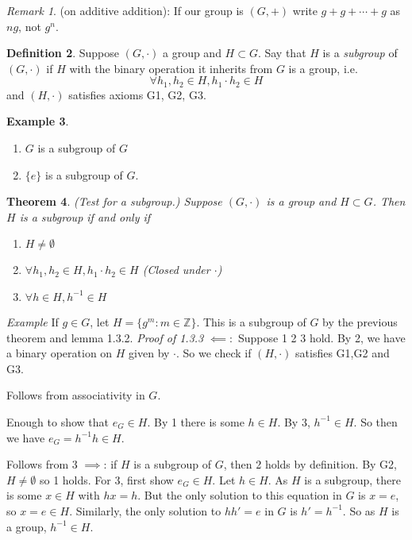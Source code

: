 \documentclass{report}
\makeatletter
\newtheorem{theorem}{Theorem}[subsection]
\theoremstyle{remark}
\newtheorem{remark}[theorem]{Remark}
\theoremstyle{definition}
\newtheorem{definition}[theorem]{Definition}
\theoremstyle{definition}
\newtheorem{example}[theorem]{Example}
\theoremstyle{theorem}
\providecommand{\varitem}{} %
\newenvironment{axioms}[1]
 {\renewcommand\varitem[1]{\item[\textbf{#1\arabic{enumi}\rlap{$##1$}.}]%
    \edef\@currentlabel{#1\arabic{enumi}{$##1$}}}%
  \enumerate[label=\textbf{#1\arabic*.}, ref=#1\arabic*]}
 {\endenumerate}
\makeatother
\begin{document}
\begin{remark}
(on additive addition): If our group is $(G,+)$ write $g+g+\cdots+g$ as $ng$, not $g^n$.
\end{remark}
\begin{definition}
Suppose $(G,\cdot)$ a group and $H \subset G$. Say that $H$ is a \emph{subgroup} of $(G,\cdot)$ if $H$ with the binary operation it inherits from $G$ is a group, i.e. 
\[\forall h_1, h_2 \in H, h_1 \cdot h_2 \in H\]
and $(H,\cdot)$ satisfies axioms G1, G2, G3.
\end{definition}
\begin{example}
\begin{enumerate}[label=\textcircled{\tiny{\arabic*}}]
    \item $G$ is a subgroup of $G$
    \item $\{e\}$ is a subgroup of $G$.
\end{enumerate}
\end{example}
\begin{theorem}
(Test for a subgroup.) Suppose $(G,\cdot)$ is a group and $H \subset G$. Then $H$ is a subgroup if and only if
\begin{enumerate}[label=\textcircled{\tiny{\arabic*}}]
    \item $H \neq \emptyset$
    \item $\forall h_1,h_2 \in H, h_1 \cdot h_2 \in H$ (Closed under $\cdot$)
    \item $\forall h \in H, h^{-1} \in H$
\end{enumerate}
\end{theorem}
\emph{Example}
If $g \in G$, let $H=\{g^m:m \in \mathbb{Z}\}$. This is a subgroup of $G$ by the previous theorem and lemma 1.3.2.
\emph{Proof of 1.3.3}
$\impliedby:$ Suppose \textcircled{\tiny{1}} \textcircled{\tiny{2}} \textcircled{\tiny{3}} hold. By \textcircled{\tiny{2}}, we have a binary operation on $H$ given by $\cdot$. So we check if $(H,\cdot)$ satisfies G1,G2 and G3.
\begin{axioms}{G}
    \item Follows from associativity in $G$.
    \item Enough to show that $e_G \in H$. By \textcircled{\tiny{1}} there is some $h \in H$. By \textcircled{\tiny{3}}, $h^{-1} \in H$. So then we have $e_G=h^{-1}h\in H$.
    \item Follows from \textcircled{\tiny{3}}
\end{axioms}
$\implies$: if $H$ is a subgroup of $G$, then \textcircled{\tiny{2}} holds by definition. By G2, $H \neq \emptyset$ so \textcircled{\tiny{1}} holds. For \textcircled{\tiny{3}}, first show $e_G \in H$. Let $h \in H$. As $H$ is a subgroup, there is some $x \in H$ with $hx = h$. But the only solution to this equation in $G$ is $x=e$, so $x=e \in H$. Similarly, the only solution to $hh'=e$ in $G$ is $h'=h^{-1}$. So as $H$ is a group, $h^{-1} \in H$.
\end{document}
